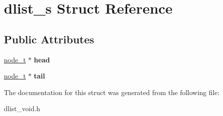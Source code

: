 \hypertarget{structdlist__s}{\section{dlist\-\_\-s Struct Reference}
\label{structdlist__s}
}
\subsection*{Public Attributes}
\begin{DoxyCompactItemize}
\item 
\hypertarget{structdlist__s_a768ee634ee23ba3b8374f0ce93712860}{\hyperlink{structnode__s}{node\-\_\-t} $\ast$ {\bfseries head}}\label{structdlist__s_a768ee634ee23ba3b8374f0ce93712860}

\item 
\hypertarget{structdlist__s_a3ff0ae73472ba1494666927c58b4e3d3}{\hyperlink{structnode__s}{node\-\_\-t} $\ast$ {\bfseries tail}}\label{structdlist__s_a3ff0ae73472ba1494666927c58b4e3d3}

\end{DoxyCompactItemize}


The documentation for this struct was generated from the following file\-:\begin{DoxyCompactItemize}
\item 
dlist\-\_\-void.\-h\end{DoxyCompactItemize}
